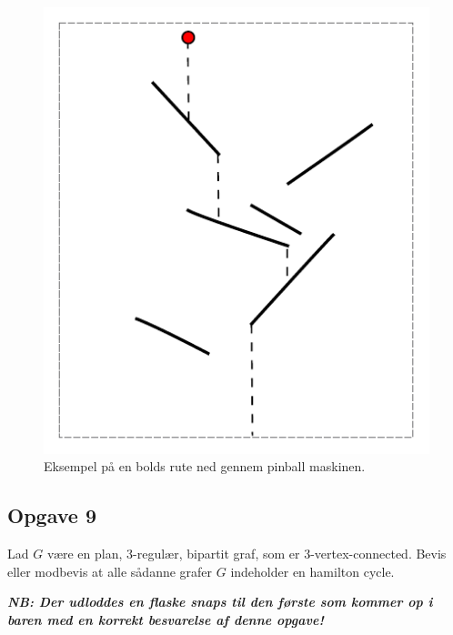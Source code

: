 \begin{figure}[h!]
    \centering
    \includegraphics[width=0.7\linewidth]{figures/pinball.pdf}
    \caption{Eksempel på en bolds rute ned gennem pinball maskinen.}
    \label{fig:pinball}
\end{figure}


\subsection{Opgave 9}

Lad $G$ være en plan, 3-regulær, bipartit graf, som er 3-vertex-connected.
Bevis eller modbevis at alle sådanne grafer $G$ indeholder en hamilton cycle.

\vspace{.1in}
\textbf{\emph{NB: Der udloddes en flaske snaps til den første som kommer op i baren med en korrekt besvarelse af denne opgave!}}

